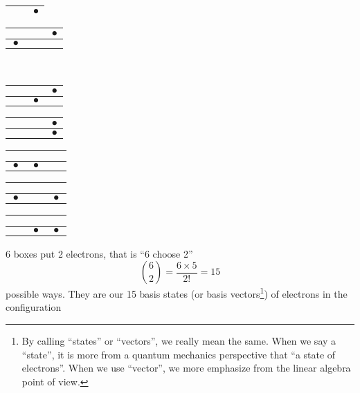 \begin{center}
\begin{tabular}{|c|c|c|}
 &  & $\bullet$ \\
\hline
\end{tabular}
\begin{tabular}{|c|c|c|}
\hline
$\phantom{\bullet}$ & $\phantom{\bullet}$ & $\bullet$ \\ \hline
$\bullet$ &  &  \\
\hline
\end{tabular} \\
\vspace{0.5em}
\begin{tabular}{|c|c|c|}
\hline
$\phantom{\bullet}$ & $\phantom{\bullet}$ & $\bullet$ \\ \hline
 & $\bullet$ &  \\
\hline
\end{tabular}
\begin{tabular}{|c|c|c|}
\hline
$\phantom{\bullet}$ & $\phantom{\bullet}$ & $\bullet$ \\ \hline
 &  & $\bullet$ \\
\hline
\end{tabular}
\begin{tabular}{|c|c|c|}
\hline
$\phantom{\bullet}$ & $\phantom{\bullet}$ & $\phantom{\bullet}$ \\ \hline
$\bullet$ & $\bullet$ &  \\
\hline
\end{tabular}
\begin{tabular}{|c|c|c|}
\hline
$\phantom{\bullet}$ & $\phantom{\bullet}$ & $\phantom{\bullet}$ \\ \hline
$\bullet$ &  & $\bullet$ \\
\hline
\end{tabular}
\begin{tabular}{|c|c|c|}
\hline
$\phantom{\bullet}$ & $\phantom{\bullet}$ & $\phantom{\bullet}$ \\ \hline
 & $\bullet$ & $\bullet$ \\
\hline
\end{tabular}
\end{center}
6 boxes put 2 electrons, that is ``6 choose 2''
\begin{equation*}
\binom{6}{2} = \frac{6\times5}{2!} = 15
\end{equation*}
possible ways. They are our 15 basis states (or basis vectors\footnote{By calling ``states''
or ``vectors'', we really mean the same. When we say a ``state'', it is more from a
quantum mechanics perspective that ``a state of electrons''. When we use ``vector'',
we more emphasize from the linear algebra point of view.}) of electrons in the configuration
